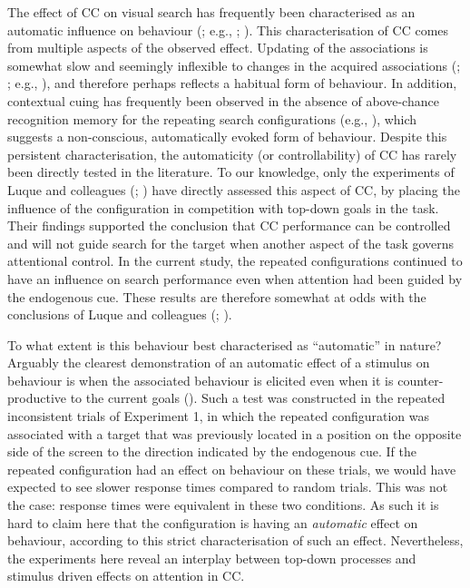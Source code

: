 \documentclass[
  man,
  floatsintext,
  longtable,
  nolmodern,
  notxfonts,
  notimes,
  colorlinks=true,linkcolor=blue,citecolor=blue,urlcolor=blue]{apa7}
\begin{document}
The effect of CC on visual search has frequently been characterised as
an automatic influence on behaviour (; e.g., ;
). This characterisation of
CC comes from multiple aspects of the observed effect. Updating of the
associations is somewhat slow and seemingly inflexible to changes in the
acquired associations (; ;
e.g., ), and therefore
perhaps reflects a habitual form of behaviour. In addition, contextual
cuing has frequently been observed in the absence of above-chance
recognition memory for the repeating search configurations (e.g.,
), which
suggests a non-conscious, automatically evoked form of behaviour.
Despite this persistent characterisation, the automaticity (or
controllability) of CC has rarely been directly tested in the
literature. To our knowledge, only the experiments of Luque and
colleagues (;
) have directly assessed
this aspect of CC, by placing the influence of the configuration in
competition with top-down goals in the task. Their findings supported
the conclusion that CC performance can be controlled and will not guide
search for the target when another aspect of the task governs
attentional control. In the current study, the repeated configurations
continued to have an influence on search performance even when attention
had been guided by the endogenous cue. These results are therefore
somewhat at odds with the conclusions of Luque and colleagues
(;
).

To what extent is this behaviour best characterised as ``automatic'' in
nature? Arguably the clearest demonstration of an automatic effect of a
stimulus on behaviour is when the associated behaviour is elicited even
when it is counter-productive to the current goals
(). Such a test was
constructed in the repeated inconsistent trials of Experiment 1, in
which the repeated configuration was associated with a target that was
previously located in a position on the opposite side of the screen to
the direction indicated by the endogenous cue. If the repeated
configuration had an effect on behaviour on these trials, we would have
expected to see slower response times compared to random trials. This
was not the case: response times were equivalent in these two
conditions. As such it is hard to claim here that the configuration is
having an \emph{automatic} effect on behaviour, according to this strict
characterisation of such an effect. Nevertheless, the experiments here
reveal an interplay between top-down processes and stimulus driven
effects on attention in CC.
\end{document}
